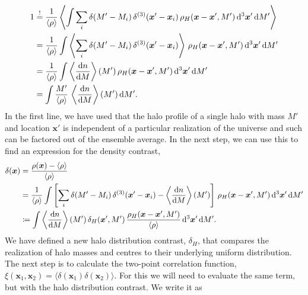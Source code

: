 \documentclass[../main.tex]{subfiles}
\begin{document}
\begin{align}
    1 &\overset{!}{=} \frac{1}{\langle \rho \rangle} \left\langle \int \sum_i \delta(M'-M_i)\,\delta^{(3)}(\boldsymbol{x}'-\boldsymbol{x}_i)\,\rho_H(\boldsymbol{x}-\boldsymbol{x}',M')\, \mathrm{d}^3 \boldsymbol{x}' \, \mathrm{d} M' \right \rangle \\
    &= \frac{1}{\langle \rho \rangle} \int \left\langle \sum_i \delta(M'-M_i)\,\delta^{(3)}(\boldsymbol{x}'-\boldsymbol{x}_i) \right\rangle\,\rho_H(\boldsymbol{x}-\boldsymbol{x}',M')\, \mathrm{d}^3 \boldsymbol{x}' \,\mathrm{d} M' \nonumber\\
    &= \frac{1}{\langle \rho \rangle} \int \left\langle  \frac{\mathrm{d} n}{\mathrm{d} M} \right\rangle(M')\,\rho_H(\boldsymbol{x}-\boldsymbol{x}',M')\, \mathrm{d}^3 \boldsymbol{x}' \,\mathrm{d} M'  \nonumber\\
    &=  \int \frac{M'}{\langle \rho \rangle} \,\left\langle  \frac{\mathrm{d} n}{\mathrm{d} M} \right\rangle(M') \,\mathrm{d} M' .\label{eq:halo_mass_function_normalization}
\end{align} 
In the first line, we have used that the halo profile of a single halo with mass $M'$ and location $\boldsymbol{x}'$ is independent of a particular realization of the universe and such can be factored out of the ensemble average. In the next step, we can use this to find an expression for the density contrast,
\begin{align}
    \label{eq:density-contrast}
    \delta(\boldsymbol{x}) &= \frac{\rho(\boldsymbol{x})-\langle \rho \rangle }{\langle \rho \rangle} \\
    &= \frac{1}{\langle \rho \rangle} \int \left[  \sum_i \delta(M'-M_i)\,\delta^{(3)}(\boldsymbol{x}'-\boldsymbol{x}_i)-\left\langle  \frac{\mathrm{d} n}{\mathrm{d} M} \right\rangle(M')\right]\,\rho_H(\boldsymbol{x}-\boldsymbol{x}',M')\, \mathrm{d}^3 \boldsymbol{x}' \,\mathrm{d} M'\\
&\coloneqq  \int \left\langle  \frac{\mathrm{d} n}{\mathrm{d} M} \right\rangle(M')\,\delta_H(\boldsymbol{x}',M') \,\frac{\rho_H(\boldsymbol{x}-\boldsymbol{x}',M')}{\langle \rho \rangle}\, \mathrm{d}^3 \boldsymbol{x}' \,\mathrm{d} M'.
\end{align}
We have defined a new halo distribution contrast, $\delta_H$, that compares the realization of halo masses and centres to their underlying uniform distribution. The next step is to calculate the two-point correlation function, $\xi(\boldsymbol{x}_1,\boldsymbol{x}_2) = \langle \delta(\boldsymbol{x}_1) \delta(\boldsymbol{x}_2) \rangle$. For this we will need to evaluate the same term, but with the halo distribution contrast. We write it as
\end{document}

